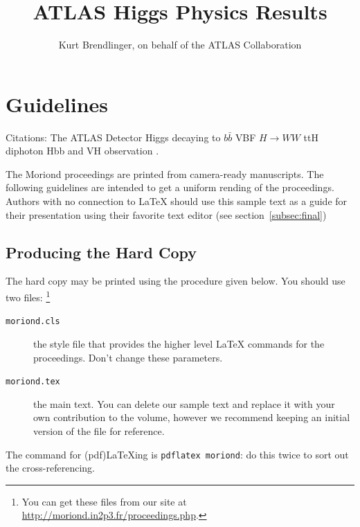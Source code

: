 \documentclass{moriond}
\begin{document}
\linenumbers

\vspace*{4cm}
\title{ATLAS Higgs Physics Results}

\author{ Kurt Brendlinger, on behalf of the ATLAS Collaboration }

\address{DESY, Notkestra\ss e 85,\\ 22607 Hamburg, Germany}

\maketitle{}

\section{Guidelines}


Citations:
The ATLAS Detector \cite{PERF-2007-01}
Higgs decaying to $b\bar b$ \cite{HIGG-2018-50}
VBF $H{\rightarrow}WW$ \cite{HIGG-2017-14}
ttH diphoton \cite{ATLAS-CONF-2019-004}
Hbb and VH observation \cite{HIGG-2018-04}.

The Moriond proceedings are printed from camera-ready manuscripts.
The following guidelines are intended to get a uniform rending of the 
proceedings. Authors with no connection to \LaTeX{} should use this
sample text as a guide for their presentation using their favorite
text editor (see section~\ref{subsec:final})

\subsection{Producing the Hard Copy}\label{subsec:prod}

The hard copy may be printed using the procedure given below.
You should use
two files: \footnote{You can get these files from
our site at \url{http://moriond.in2p3.fr/proceedings.php}.}
\begin{description}
\item[\texttt{moriond.cls}] the style file that provides the higher
level \LaTeX{} commands for the proceedings. Don't change these parameters.
\item[\texttt{moriond.tex}] the main text. You can delete our sample
text and replace it with your own contribution to the volume, however we
recommend keeping an initial version of the file for reference.
\end{description}
The command for (pdf)\LaTeX ing is \texttt{pdflatex moriond}: do this twice to
sort out the cross-referencing.
\end{document}
